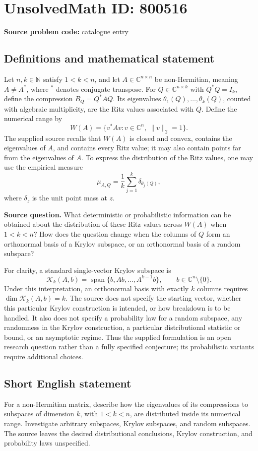 \documentclass[11pt]{article}
\newcommand{\N}{\mathbb{N}}
\newcommand{\C}{\mathbb{C}}
\begin{document}
\section*{UnsolvedMath ID: 800516}
\textbf{Source problem code:} catalogue entry
\subsection{Definitions and mathematical statement}
Let \(n,k\in\N\) satisfy \(1<k<n\), and let \(A\in\C^{n\times n}\) be non-Hermitian, meaning \(A\ne A^*\), where \(^*\) denotes conjugate transpose. For \(Q\in\C^{n\times k}\) with \(Q^*Q=I_k\), define the compression \(B_Q=Q^*AQ\). Its eigenvalues \(\theta_1(Q),\ldots,\theta_k(Q)\), counted with algebraic multiplicity, are the Ritz values associated with \(Q\). Define the numerical range by
\[
W(A)=\{v^*Av:v\in\C^n,\ \|v\|_2=1\}.
\]
The supplied source recalls that \(W(A)\) is closed and convex, contains the eigenvalues of \(A\), and contains every Ritz value; it may also contain points far from the eigenvalues of \(A\). To express the distribution of the Ritz values, one may use the empirical measure
\[
\mu_{A,Q}=\frac1k\sum_{j=1}^k\delta_{\theta_j(Q)},
\]
where \(\delta_z\) is the unit point mass at \(z\).

\textbf{Source question.} What deterministic or probabilistic information can be obtained about the distribution of these Ritz values across \(W(A)\) when \(1<k<n\)? How does the question change when the columns of \(Q\) form an orthonormal basis of a Krylov subspace, or an orthonormal basis of a random subspace?

For clarity, a standard single-vector Krylov subspace is
\[
\mathcal K_k(A,b)=\operatorname{span}\{b,Ab,\ldots,A^{k-1}b\},\qquad b\in\C^n\setminus\{0\}.
\]
Under this interpretation, an orthonormal basis with exactly \(k\) columns requires \(\dim\mathcal K_k(A,b)=k\). The source does not specify the starting vector, whether this particular Krylov construction is intended, or how breakdown is to be handled. It also does not specify a probability law for a random subspace, any randomness in the Krylov construction, a particular distributional statistic or bound, or an asymptotic regime. Thus the supplied formulation is an open research question rather than a fully specified conjecture; its probabilistic variants require additional choices.
\subsection{Short English statement}
For a non-Hermitian matrix, describe how the eigenvalues of its compressions to subspaces of dimension \(k\), with \(1<k<n\), are distributed inside its numerical range. Investigate arbitrary subspaces, Krylov subspaces, and random subspaces. The source leaves the desired distributional conclusions, Krylov construction, and probability laws unspecified.
\end{document}
